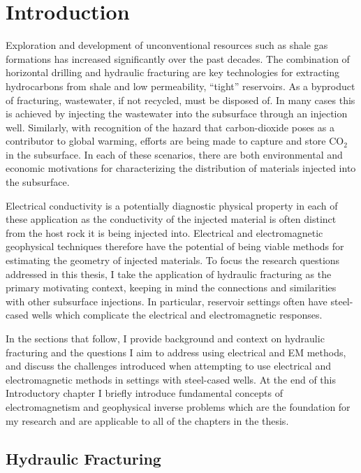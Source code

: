
\chapter{Introduction}
\label{ch:introduction}

Exploration and development of unconventional resources such as shale gas formations has increased significantly over the past decades. The combination of horizontal drilling and hydraulic fracturing are key technologies for extracting hydrocarbons from shale and low permeability, ``tight'' reservoirs. As a byproduct of fracturing, wastewater, if not recycled, must be disposed of. In many cases this is achieved by injecting the wastewater into the subsurface through an injection well. Similarly, with recognition of the hazard that carbon-dioxide poses as a contributor to global warming, efforts are being made to capture and store CO$_2$ in the subsurface. In each of these scenarios, there are both environmental and economic motivations for characterizing the distribution of materials injected into the subsurface.

Electrical conductivity is a potentially diagnostic physical property in each of these application as the conductivity of the injected material is often distinct from the host rock it is being injected into. Electrical and electromagnetic geophysical techniques therefore have the potential of being viable methods for estimating the geometry of injected materials. To focus the research questions addressed in this thesis, I take the application of hydraulic fracturing as the primary motivating context, keeping in mind the connections and similarities with other subsurface injections. In particular, reservoir settings often have steel-cased wells which complicate the electrical and electromagnetic responses.

In the sections that follow, I provide background and context on hydraulic fracturing and the questions I aim to address using electrical and EM methods, and discuss the challenges introduced when attempting to use electrical and electromagnetic methods in settings with steel-cased wells. At the end of this Introductory chapter I briefly introduce fundamental concepts of electromagnetism and geophysical inverse problems which are the foundation for my research and are applicable to all of the chapters in the thesis.
\section{Hydraulic Fracturing}
\label{sec:hydraulic-fracturing}

